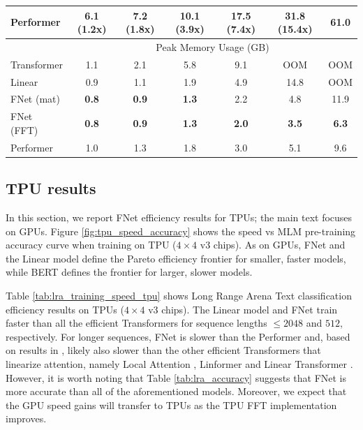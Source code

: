 \begin{table}
\begin{tabular}{l | c c c c c c}
         Performer & 6.1 (1.2x) & 7.2 (1.8x) & 10.1 (3.9x) & \textbf{17.5 (7.4x)} & \textbf{31.8 (15.4x)} & \textbf{61.0} \\ \hline
         & \multicolumn{6}{c}{Peak Memory Usage (GB)} \\ \hline
         Transformer & 1.1 & 2.1 & 5.8 & 9.1 & OOM & OOM \\
         Linear & 0.9 & 1.1 & 1.9 & 4.9 & 14.8 & OOM \\
         FNet (mat) & \textbf{0.8} & \textbf{0.9} & \textbf{1.3} & 2.2 & 4.8 & 11.9 \\
         FNet (FFT) & \textbf{0.8} & \textbf{0.9} & \textbf{1.3} & \textbf{2.0} & \textbf{3.5} & \textbf{6.3} \\
         Performer & 1.0 & 1.3 & 1.8 & 3.0 & 5.1 & 9.6 \\ \hline
    \end{tabular}
\end{table}


\subsection{TPU results}
\label{app:tpu}

In this section, we report FNet efficiency results for TPUs; the main text focuses on GPUs. Figure \ref{fig:tpu_speed_accuracy} shows the speed vs MLM pre-training accuracy curve when training on TPU ($4\times4$ v3 chips). As on GPUs, FNet and the Linear model define the Pareto efficiency frontier for smaller, faster models, while BERT defines the frontier for larger, slower models.

Table \ref{tab:lra_training_speed_tpu} shows Long Range Arena Text classification efficiency results on TPUs ($4\times4$ v3 chips). The Linear model and FNet train faster than all the efficient Transformers for sequence lengths $\leq2048$ and $512$, respectively. For longer sequences, FNet is slower than the Performer and, based on results in \citet{tay2020long}, likely also slower than the other efficient Transformers that linearize attention, namely Local Attention \citep{parmar2018image}, Linformer \citep{wang2020linformer} and Linear Transformer \citep{katharopoulos2020transformers}. However, it is worth noting that Table \ref{tab:lra_accuracy} suggests that FNet is more accurate than all of the aforementioned models. Moreover, we expect that the GPU speed gains will transfer to TPUs as the TPU FFT implementation improves.



